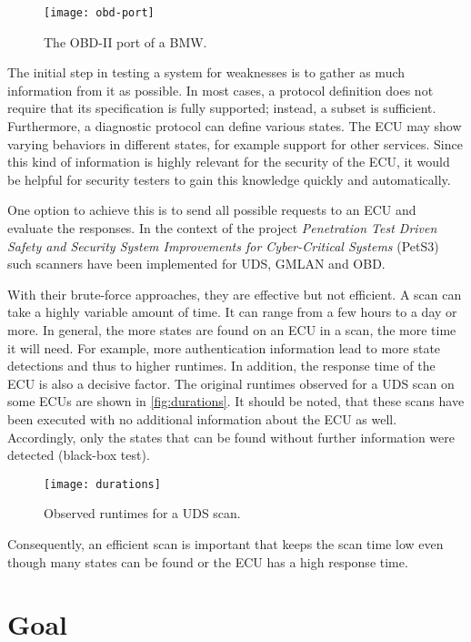 \begin{figure}[htb]
    \centering
    \texttt{[image: obd-port]}
    \caption{The OBD-II port of a BMW.}
    \label{fig:obd-port}
\end{figure}

The initial step in testing a system for weaknesses is to gather as much information from it as possible. In most cases, a protocol definition does not require that its specification is fully supported; instead, a subset is sufficient.
Furthermore, a diagnostic protocol can define various states. The ECU may show varying behaviors in different states, for example support for other services. Since this kind of information is highly relevant for the security of the ECU, it would be helpful for security testers to gain this knowledge quickly and automatically.

One option to achieve this is to send all possible requests to an ECU and evaluate the responses. In the context of the project \emph{Penetration Test Driven Safety and Security System Improvements for Cyber-Critical Systems} (PetS3) \cite{pets3} such scanners have been implemented for UDS, GMLAN and OBD.

With their brute-force approaches, they are effective but not efficient. A scan can take a highly variable amount of time. It can range from a few hours to a day or more. In general, the more states are found on an ECU in a scan, the more time it will need. For example, more authentication information lead to more state detections and thus to higher runtimes. In addition, the response time of the ECU is also a decisive factor. The original runtimes observed for a UDS scan on some ECUs are shown in \autoref{fig:durations}. It should be noted, that these scans have been executed with no additional information about the ECU as well. Accordingly, only the states that can be found without further information were detected (black-box test).

\begin{figure}[htb]
    \centering
    \texttt{[image: durations]}
    \caption{Observed runtimes for a UDS scan.}
    \label{fig:durations}
\end{figure}

Consequently, an efficient scan is important that keeps the scan time low even though many states can be found or the ECU has a high response time.

\section{Goal}

